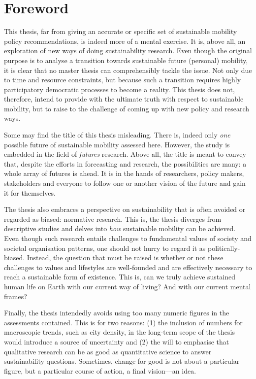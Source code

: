 \cleardoublepage %

\chapter*{Foreword} %
This thesis, far from giving an accurate or specific set of sustainable mobility policy recommendations, is indeed more of a mental exercise. It is, above all, an exploration of new ways of doing sustainability research. Even though the original purpose is to analyse a transition towards sustainable future (personal) mobility, it is clear that no master thesis can comprehensibly tackle the issue. Not only due to time and resource constraints, but because such a transition requires highly participatory democratic processes to become a reality. This thesis does not, therefore, intend to provide with the ultimate truth with respect to sustainable mobility, but to raise to the challenge of coming up with new policy and research ways.

Some may find the title of this thesis misleading. There is, indeed only \emph{one} possible future of sustainable mobility assessed here. However, the study is embedded in the field of \emph{futures} research. Above all, the title is meant to convey that, despite the efforts in forecasting and research, the possibilities are many: a whole array of futures is ahead. It is in the hands of researchers, policy makers, stakeholders and everyone to follow one or another vision of the future and gain it for themselves.

The thesis also embraces a perspective on sustainability that is often avoided or regarded as biased: normative research. This is, the thesis diverges from descriptive studies and delves into \emph{how} sustainable mobility can be achieved. Even though such research entails challenges to fundamental values of society and societal organisation patterns, one should not hurry to regard it as politically-biased. Instead, the question that must be raised is whether or not these challenges to values and lifestyles are well-founded and are effectively necessary to reach a sustainable form of existence. This is, can we truly achieve sustained human life on Earth with our current way of living? And with our current mental frames?

Finally, the thesis intendedly avoids using too many numeric figures in the assessments contained. This is for two reasons: (1) the inclusion of numbers for macroscopic trends, such as city density, in the long-term scope of the thesis would introduce a source of uncertainty and (2) the will to emphasise that qualitative research can be as good as quantitative science to answer sustainability questions. Sometimes, change for good is not about a particular figure, but a particular course of action, a final vision---an idea.

\cleardoublepage %
